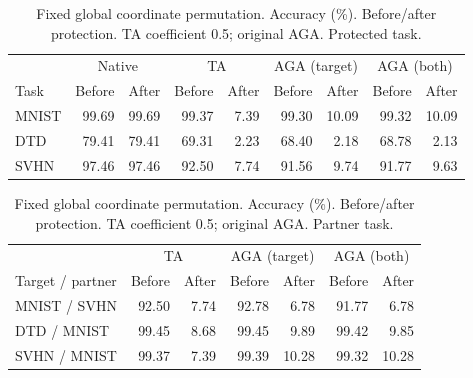 \begin{table}[t]
\centering
\footnotesize
\setlength{\tabcolsep}{4pt}
\begin{tabular}{lrrrrrrrr}
\toprule
 & \multicolumn{2}{c}{Native} & \multicolumn{2}{c}{TA} & \multicolumn{2}{c}{AGA (target)} & \multicolumn{2}{c}{AGA (both)} \\
Task & Before & After & Before & After & Before & After & Before & After \\
\midrule
MNIST & 99.69 & 99.69 & 99.37 & 7.39 & 99.30 & 10.09 & 99.32 & 10.09 \\
DTD & 79.41 & 79.41 & 69.31 & 2.23 & 68.40 & 2.18 & 68.78 & 2.13 \\
SVHN & 97.46 & 97.46 & 92.50 & 7.74 & 91.56 & 9.74 & 91.77 & 9.63 \\
\bottomrule
\end{tabular}
\caption{Fixed global coordinate permutation. Accuracy (\%). Before/after protection. TA coefficient 0.5; original AGA. Protected task.}
\label{tab:coordinate-target}
\end{table}

\begin{table}[t]
\centering
\footnotesize
\setlength{\tabcolsep}{4pt}
\begin{tabular}{lrrrrrr}
\toprule
 & \multicolumn{2}{c}{TA} & \multicolumn{2}{c}{AGA (target)} & \multicolumn{2}{c}{AGA (both)} \\
Target / partner & Before & After & Before & After & Before & After \\
\midrule
MNIST / SVHN & 92.50 & 7.74 & 92.78 & 6.78 & 91.77 & 6.78 \\
DTD / MNIST & 99.45 & 8.68 & 99.45 & 9.89 & 99.42 & 9.85 \\
SVHN / MNIST & 99.37 & 7.39 & 99.39 & 10.28 & 99.32 & 10.28 \\
\bottomrule
\end{tabular}
\caption{Fixed global coordinate permutation. Accuracy (\%). Before/after protection. TA coefficient 0.5; original AGA. Partner task.}
\label{tab:coordinate-partner}
\end{table}
